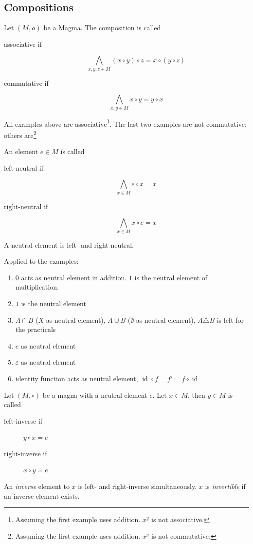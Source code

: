 \documentclass[a4paper,landscape,twocolumn]{article}
\begin{document}
\subsection{Compositions}

Let $(M, a)$ be a Magma. The composition is called

\begin{description}
  \item[associative if]
    \[ \bigwedge_{x,y,z \in M} (x \circ y) \circ z = x \circ (y \circ z) \]
  \item[commutative if]
    \[ \bigwedge_{x,y \in M} x \circ y = y \circ x \]
\end{description}

All examples above are associative\footnote{Assuming the first example uses addition. $x^y$ is not associative.}.
The last two examples are not commutative; others are\footnote{Assuming the first example uses addition. $x^y$ is not commutative.}

An element $e \in M$ is called
\begin{description}
  \item[left-neutral if] \[ \bigwedge_{x \in M} e \circ x = x \]
  \item[right-neutral if] \[ \bigwedge_{x \in M} x \circ e = x \]
\end{description}
A neutral element is left- and right-neutral.

Applied to the examples:
\begin{enumerate}
  \item $0$ acts as neutral element in addition. $1$ is the neutral element of multiplication.
  \item $1$ is the neutral element
  \item $A \cap B$ ($X$ as neutral element), $A \cup B$ ($\emptyset$ as neutral element), $A \triangle B$ is left for the practicals
  \item $e$ as neutral element
  \item $\varepsilon$ as neutral element
  \item identity function acts as neutral element, $\operatorname{id} \circ f = f' = f \circ \operatorname{id}$
\end{enumerate}

Let $(M, \circ)$ be a magna with a neutral element $e$.
Let $x \in M$, then $y \in M$ is called
\begin{description}
  \item[left-inverse if] $y \circ x = e$
  \item[right-inverse if] $x \circ y = e$
\end{description}
An \emph{inverse} element to $x$ is left- and right-inverse simultaneously.
$x$ is \emph{invertible} if an inverse element exists.
\end{document}
